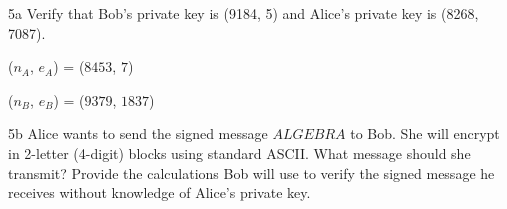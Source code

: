 

\begin{question}{5a}
Verify that Bob's private key is (9184, 5) and Alice's private key is (8268, 7087).

($n_A$, $e_A$) = ($8453$, $7$)

($n_B$, $e_B$) = ($9379$, $1837$)
\end{question}


\begin{question}{5b}
Alice wants to send the signed message $ALGEBRA$ to Bob. She will encrypt in
2-letter (4-digit) blocks using standard ASCII. What message should she transmit? Provide
the calculations Bob will use to verify the signed message he receives without knowledge of
Alice's private key.
\end{question}

